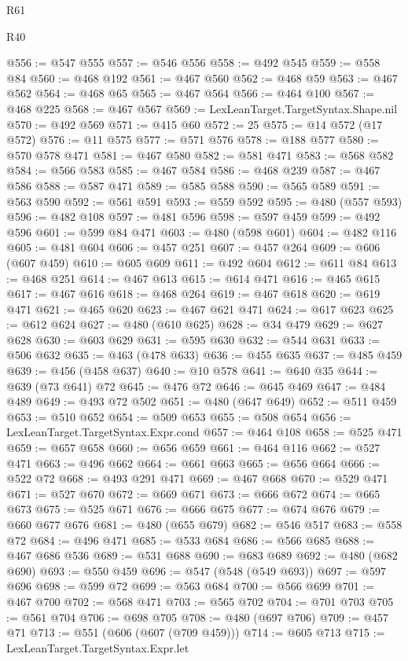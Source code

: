 \begin{lexlean}{R61}
\begin{lexlean}{R40}
\begin{coremodule}
{{{{{{{{{{{{{{{{{{{{{{{{{{{{{{{{{{{{{{{{{{{{{{{{{{{{{{{{{{{{{{{{{{{{{{{{{{{{{{{{{{{{{{{{{{{{{{{{{{{{{{{{{{{{{@556 := @547 @555
@557 := @546 @556
@558 := @492 @545
@559 := @558 @84
@560 := @468 @192
@561 := @467 @560
@562 := @468 @59
@563 := @467 @562
@564 := @468 @65
@565 := @467 @564
@566 := @464 @100
@567 := @468 @225
@568 := @467 @567
@569 := LexLeanTarget.TargetSyntax.Shape.nil
@570 := @492 @569
@571 := @415 @60
@572 := 25
@575 := @14 @572 (@17 @572)
@576 := @11 @575
@577 := @571 @576
@578 := @188 @577
@580 := @570 @578 @471
@581 := @467 @580
@582 := @581 @471
@583 := @568 @582
@584 := @566 @583
@585 := @467 @584
@586 := @468 @239
@587 := @467 @586
@588 := @587 @471
@589 := @585 @588
@590 := @565 @589
@591 := @563 @590
@592 := @561 @591
@593 := @559 @592
@595 := @480 (@557 @593)
@596 := @482 @108
@597 := @481 @596
@598 := @597 @459
@599 := @492 @596
@601 := @599 @84 @471
@603 := @480 (@598 @601)
@604 := @482 @116
@605 := @481 @604
@606 := @457 @251
@607 := @457 @264
@609 := @606 (@607 @459)
@610 := @605 @609
@611 := @492 @604
@612 := @611 @84
@613 := @468 @251
@614 := @467 @613
@615 := @614 @471
@616 := @465 @615
@617 := @467 @616
@618 := @468 @264
@619 := @467 @618
@620 := @619 @471
@621 := @465 @620
@623 := @467 @621 @471
@624 := @617 @623
@625 := @612 @624
@627 := @480 (@610 @625)
@628 := @34 @479
@629 := @627 @628
@630 := @603 @629
@631 := @595 @630
@632 := @544 @631
@633 := @506 @632
@635 := @463 (@478 @633)
@636 := @455 @635
@637 := @485 @459
@639 := @456 (@458 @637)
@640 := @10 @578
@641 := @640 @35
@644 := @639 (@73 @641) @72
@645 := @476 @72
@646 := @645 @469
@647 := @484 @489
@649 := @493 @72 @502
@651 := @480 (@647 @649)
@652 := @511 @459
@653 := @510 @652
@654 := @509 @653
@655 := @508 @654
@656 := LexLeanTarget.TargetSyntax.Expr.cond
@657 := @464 @108
@658 := @525 @471
@659 := @657 @658
@660 := @656 @659
@661 := @464 @116
@662 := @527 @471
@663 := @496 @662
@664 := @661 @663
@665 := @656 @664
@666 := @522 @72
@668 := @493 @291 @471
@669 := @467 @668
@670 := @529 @471
@671 := @527 @670
@672 := @669 @671
@673 := @666 @672
@674 := @665 @673
@675 := @525 @671
@676 := @666 @675
@677 := @674 @676
@679 := @660 @677 @676
@681 := @480 (@655 @679)
@682 := @546 @517
@683 := @558 @72
@684 := @496 @471
@685 := @533 @684
@686 := @566 @685
@688 := @467 @686 @536
@689 := @531 @688
@690 := @683 @689
@692 := @480 (@682 @690)
@693 := @550 @459
@696 := @547 (@548 (@549 @693))
@697 := @597 @696
@698 := @599 @72
@699 := @563 @684
@700 := @566 @699
@701 := @467 @700
@702 := @568 @471
@703 := @565 @702
@704 := @701 @703
@705 := @561 @704
@706 := @698 @705
@708 := @480 (@697 @706)
@709 := @457 @71
@713 := @551 (@606 (@607 (@709 @459)))
@714 := @605 @713
@715 := LexLeanTarget.TargetSyntax.Expr.let
}}}}}}}}}}}}}}}}}}}}}}}}}}}}}}}}}}}}}}}}}}}}}}}}}}}}}}}}}}}}}}}}}}}}}}}}}}}}}}}}}}}}}}}}}}}}}}}}}}}}}}}}}}}}}
\end{coremodule}
\end{lexlean}
\end{lexlean}
